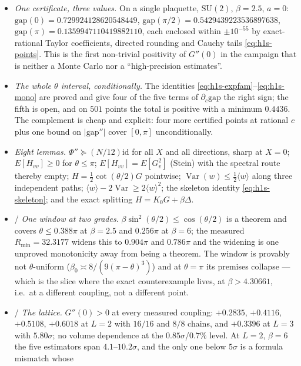 \begin{itemize}
\item \LT{} \emph{One certificate, three values.} On a single plaquette, $\mathrm{SU}(2)$, $\beta=2.5$,
$a=0$: $\mathrm{gap}(0)=0.729924128620548449$, $\mathrm{gap}(\pi/2)=0.5429439223536897638$,
$\mathrm{gap}(\pi)=0.1359947110419882110$, each enclosed within $\pm10^{-55}$ by exact-rational
Taylor coefficients, directed rounding and Cauchy tails \eqref{eq:h1s-points}. This is the first
non-trivial positivity of $G''(0)$ in the campaign that is neither a Monte Carlo nor a
``high-precision estimates''.
\item \LC{} \emph{The whole $\theta$ interval, conditionally.} The identities
\eqref{eq:h1s-expfam}--\eqref{eq:h1s-mono} are proved and give four of the five terms of
$\partial_{c}\mathrm{gap}$ the right sign; the fifth is open, and on $501$ points the total is positive
with a minimum $0.4436$. The complement is cheap and explicit: four more certified points at rational
$c$ plus one bound on $|\mathrm{gap}''|$ cover $[0,\pi]$ unconditionally.
\item \LT{} \emph{Eight lemmas.} $\Phi''\succeq(N/12)\mathrm{id}$ for all $X$ and all directions,
sharp at $X=0$; $E[H_{vv}]\ge0$ for $\theta\le\pi$; $E[H_{vv}]=E[G_{v}^{2}]$ (Stein) with the spectral
route thereby empty; $H=\tfrac12\cot(\theta/2)G$ pointwise; $\operatorname{Var}(w)\le\tfrac12\langle w\rangle$
along three independent paths; $\langle w\rangle-2\operatorname{Var}\ge2\langle w\rangle^{2}$; the
skeleton identity \eqref{eq:h1s-skeleton}; and the exact splitting
$H=K_{0}G+\beta\Delta$.
\item \LT{}/\LC{} \emph{One window at two grades.} $\beta\sin^{2}(\theta/2)\le\cos(\theta/2)$ is a
theorem and covers $\theta\le0.388\pi$ at $\beta=2.5$ and $0.256\pi$ at $\beta=6$; the measured
$R_{\min}=32.3177$ widens this to $0.904\pi$ and $0.786\pi$ and the widening is one unproved
monotonicity away from being a theorem. The window is provably not $\theta$-uniform
($\beta_{0}\asymp8/(9(\pi-\theta)^{3})$) and at $\theta=\pi$ its premises collapse --- which is the
slice where the exact counterexample lives, at $\beta>4.30661$, i.e.\ at a different coupling, not a
different point.
\item \LE{}/\LM{} \emph{The lattice.} $G''(0)>0$ at every measured coupling: $+0.2835$, $+0.4116$,
$+0.5108$, $+0.6018$ at $L=2$ with $16/16$ and $8/8$ chains, and $+0.3396$ at $L=3$ with
$5.80\sigma$; no volume dependence at the $0.85\sigma$/$0.7\%$ level. At $L=2$, $\beta=6$ the five
estimators span $4.1$--$10.2\sigma$, and the only one below $5\sigma$ is a formula mismatch whose

\end{itemize}
